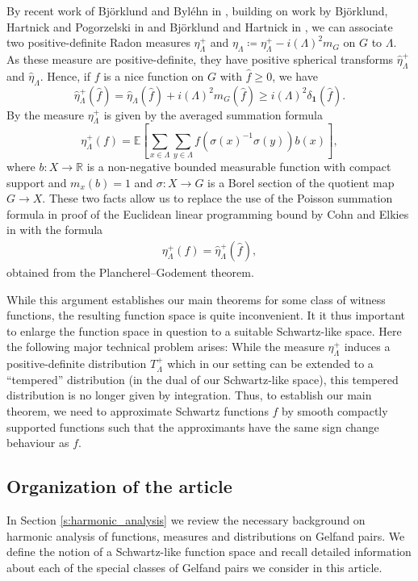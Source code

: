 \documentclass[12pt,reqno,a4paper]{amsart}
\theoremstyle{theorem}
\theoremstyle{definition}
\numberwithin{theorem}{section}
\numberwithin{equation}{section}
\newcommand{\R}{\mathbb{R}}
\begin{document}
By recent work of Björklund and Byléhn in \cite{MichaelMattiasArXiv}, building on work by Björklund, Hartnick and Pogorzelski in \cite{BHP3} and Björklund and Hartnick in \cite{BjorklundHartnickHyperuniformity}, we can associate two positive-definite Radon measures $\eta_\Lambda^+$ and $\eta_\Lambda\coloneqq \eta_\Lambda^+-i(\Lambda)^2m_G$ on $G$ to $\Lambda$.
As these measure are positive-definite, they have positive spherical transforms $\widehat{\eta}_\Lambda^+$ and $\widehat{\eta}_\Lambda$. Hence, if $f$ is a nice function on $G$ with $\widehat{f}\geq 0$, we have 
\[\widehat{\eta}_\Lambda^+(\widehat{f}) = \widehat{\eta}_\Lambda(\widehat{f})+i(\Lambda)^2\widehat{m}_G(\widehat{f})\geq i(\Lambda)^2\delta_{\mathbf{1}}(\widehat{f}).\]
By \cite{MichaelMattiasArXiv} the measure $\eta_\Lambda^+$ is given by the averaged summation formula
\[\eta_\Lambda^+(f)=\mathbb{E}\left[\sum_{x\in \Lambda}\sum_{y\in \Lambda}f(\sigma(x)^{-1}\sigma(y))b(x)\right],\]
where $b:X\to \R$ is a non-negative bounded measurable function with compact support and $m_x(b)=1$ and $\sigma:X\to G$ is a Borel section of the quotient map $G\to X$.
These two facts allow us to replace the use of the Poisson summation formula in proof of the Euclidean linear programming bound by Cohn and Elkies in \cite{CohnElkies2003} with the formula
\begin{align}\label{e:Poisson_replacement}\eta_\Lambda^+(f) = \widehat{\eta}^+_\Lambda(\widehat{f}),\end{align}
obtained from the Plancherel--Godement theorem.

While this argument establishes our main theorems for some class of witness functions, the resulting function space is quite inconvenient. It it thus important to enlarge the function space in question to a suitable Schwartz-like space. Here the following major technical problem arises:
While the measure $\eta_\Lambda^+$ induces a positive-definite distribution $T_\Lambda^+$ which in our setting can be extended to a ``tempered'' distribution (in the dual of our Schwartz-like space), this tempered distribution is no longer given by integration. Thus, to establish our main theorem, we need to approximate Schwartz functions $f$ by smooth compactly supported functions such that the approximants have the same sign change behaviour as $f$.

\subsection{Organization of the article}
In Section \ref{s:harmonic_analysis} we review the necessary background on harmonic analysis of functions, measures and distributions on Gelfand pairs. We define the notion of a Schwartz-like function space and recall detailed information about each of the special classes of Gelfand pairs we consider in this article.
\end{document}
